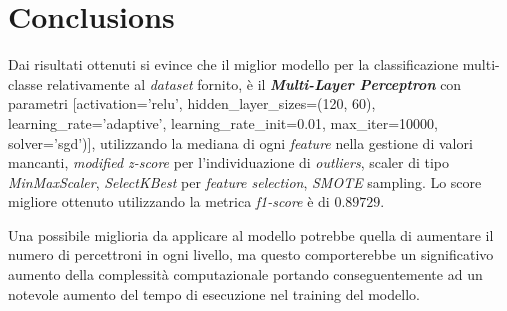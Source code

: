 \section{Conclusions}

        Dai risultati ottenuti si evince che il miglior modello per la classificazione multi-classe relativamente al \textit{dataset} fornito, è il \textbf{\textit{Multi-Layer Perceptron}} con parametri [activation='relu', hidden\_layer\_sizes=(120, 60), learning\_rate='adaptive', learning\_rate\_init=0.01, max\_iter=10000, solver='sgd')], utilizzando la mediana di ogni \textit{feature} nella gestione di valori mancanti, \textit{modified z-score} per l'individuazione di \textit{outliers}, scaler di tipo \textit{MinMaxScaler}, \textit{SelectKBest} per \textit{feature selection}, \textit{SMOTE} sampling. Lo score migliore ottenuto utilizzando la metrica \textit{f1-score} è di $0.89729$.
        \bigbreak
        
        Una possibile miglioria da applicare al modello potrebbe quella di aumentare il numero di percettroni in ogni livello, ma questo comporterebbe un significativo aumento della complessità computazionale portando conseguentemente ad un notevole aumento del tempo di esecuzione nel training del modello.